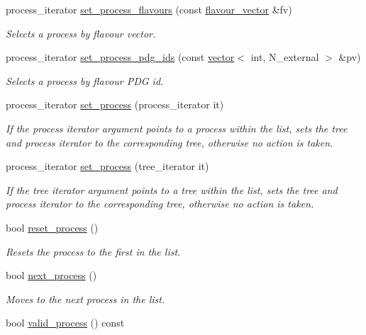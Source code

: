 \begin{DoxyCompactItemize}
process\-\_\-iterator \hyperlink{a00070_a566045f554f719276a3e0f1b98f6aae4}{set\-\_\-process\-\_\-flavours} (const \hyperlink{a00559}{flavour\-\_\-vector} \&fv)
\begin{DoxyCompactList}\small\item\em Selects a process by flavour vector. \end{DoxyCompactList}\item 
process\-\_\-iterator \hyperlink{a00070_a1afddfffa00dd964d59e896934874eda}{set\-\_\-process\-\_\-pdg\-\_\-ids} (const \hyperlink{a00559}{vector}$<$ int, N\-\_\-external $>$ \&pv)
\begin{DoxyCompactList}\small\item\em Selects a process by flavour P\-D\-G id. \end{DoxyCompactList}\item 
process\-\_\-iterator \hyperlink{a00070_ace7a8ee9aa706dbba692db474ef08137}{set\-\_\-process} (process\-\_\-iterator it)
\begin{DoxyCompactList}\small\item\em If the process iterator argument points to a process within the list, sets the tree and process iterator to the corresponding tree, otherwise no action is taken. \end{DoxyCompactList}\item 
process\-\_\-iterator \hyperlink{a00070_af627000c0a9297d08d1c619cebed3094}{set\-\_\-process} (tree\-\_\-iterator it)
\begin{DoxyCompactList}\small\item\em If the tree iterator argument points to a tree within the list, sets the tree and process iterator to the corresponding tree, otherwise no action is taken. \end{DoxyCompactList}\item 
\hypertarget{a00070_a58ac0e4e0863aabc955b54a6d07632cd}{bool \hyperlink{a00070_a58ac0e4e0863aabc955b54a6d07632cd}{reset\-\_\-process} ()}\label{a00070_a58ac0e4e0863aabc955b54a6d07632cd}

\begin{DoxyCompactList}\small\item\em Resets the process to the first in the list. \end{DoxyCompactList}\item 
bool \hyperlink{a00070_aa868c04918fdb2f192565892ac10dee5}{next\-\_\-process} ()
\begin{DoxyCompactList}\small\item\em Moves to the next process in the list. \end{DoxyCompactList}\item 
\hypertarget{a00070_a4d7e1455d11c250b296378049592b7d2}{bool \hyperlink{a00070_a4d7e1455d11c250b296378049592b7d2}{valid\-\_\-process} () const }\label{a00070_a4d7e1455d11c250b296378049592b7d2}


\end{DoxyCompactItemize}
